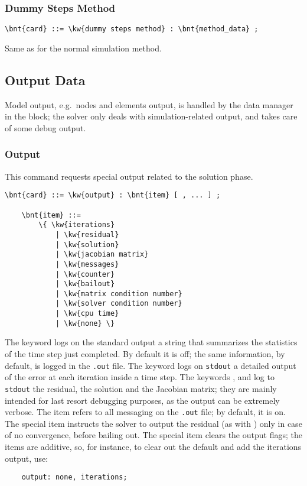 \subsubsection{Dummy Steps Method}
\begin{Verbatim}[commandchars=\\\{\}]
    \bnt{card} ::= \kw{dummy steps method} : \bnt{method_data} ;
\end{Verbatim}
Same as for the normal simulation method. 

\subsection{Output Data}\label{sec:PROBLEMS:OUTPUT}
Model output, e.g.\ nodes and elements output, is handled
by the data manager in the  block;
the solver only deals with simulation-related output,
and takes care of some debug output.

\subsubsection{Output}
This command requests special output related to the solution phase.
\begin{Verbatim}[commandchars=\\\{\}]
    \bnt{card} ::= \kw{output} : \bnt{item} [ , ... ] ;

    \bnt{item} ::=
        \{ \kw{iterations}
            | \kw{residual}
            | \kw{solution}
            | \kw{jacobian matrix}
            | \kw{messages}
            | \kw{counter}
            | \kw{bailout}
            | \kw{matrix condition number}
            | \kw{solver condition number}
            | \kw{cpu time}
            | \kw{none} \}
\end{Verbatim}
The keyword  logs on the standard output a string
that summarizes the statistics of the time step just completed.
By default it is off; the same information, by default,
is logged in the \texttt{.out} file.
The keyword  logs on \texttt{stdout}
a detailed output of the error at each iteration inside a time step.
The keywords ,  and 
log to \texttt{stdout} the residual, the solution and the Jacobian matrix;
they are mainly intended for last resort debugging purposes,
as the output can be extremely verbose.
The item  refers to all messaging on the \texttt{.out} file;
by default, it is on.
The special item  instructs the solver to output the residual
(as with ) only in case of no convergence, before bailing out.
The special item  clears the output flags; the items
are additive, so, for instance, to clear out the default 
and add the iterations output, use:
\begin{verbatim}
    output: none, iterations;
\end{verbatim}

